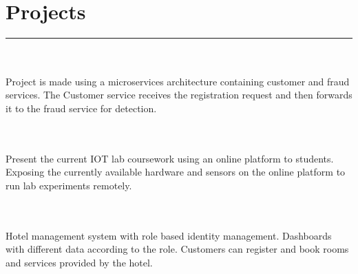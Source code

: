\documentclass[]{../../rahulworld-resume}
\begin{document}
\hfill
\begin{minipage}[t]{0.57\textwidth} 
\hspace*{0pt}\hfill    \\
\hspace*{0pt}\hfill    \\
\hspace*{0pt}\hfill    \\
\hspace*{0pt}\hfill    \\

\section{Projects} %
\noindent\rule{11 cm}{0.1pt}


\datecolor{}   
\noindent
\hspace{5em}%
\begin{minipage}{1\textwidth\vspace{2pt}}
\\\\
Project is made using a microservices architecture containing customer and fraud services. The Customer service receives the registration request and then forwards it to the fraud service for detection.
\end{minipage}
\sectionsep

\datecolor{} 
\noindent
\hspace{5em}%
\begin{minipage}{1\textwidth\vspace{2pt}}
\\\\
Present the current IOT lab coursework using an online platform to students. Exposing the currently available hardware and sensors on the online platform to run lab experiments remotely.
\end{minipage}
\sectionsep

\datecolor{}  
\noindent
\hspace{5em}%
\begin{minipage}{1\textwidth\vspace{2pt}}
\\\\
Hotel management system with role based identity management. Dashboards with different data according to the role. Customers can register and book rooms and services provided by the hotel.
\end{minipage}
\sectionsep


\end{minipage}
\end{document}
